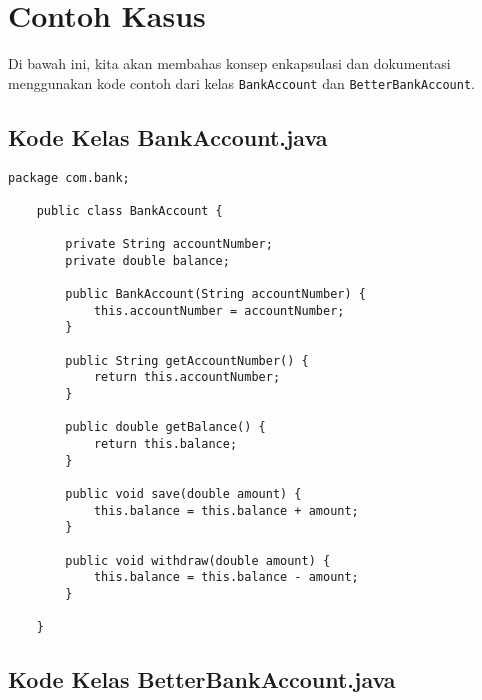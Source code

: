 \section{Contoh Kasus}

Di bawah ini, kita akan membahas konsep enkapsulasi dan dokumentasi menggunakan kode contoh dari kelas \texttt{BankAccount} dan \texttt{BetterBankAccount}.

\subsection{Kode Kelas BankAccount.java}

\begin{lstlisting}[style=JavaStyle, caption={Kode Java: BankAccount.java}]
	package com.bank;
	
	public class BankAccount {
		
		private String accountNumber;
		private double balance;
		
		public BankAccount(String accountNumber) {
			this.accountNumber = accountNumber;
		}
		
		public String getAccountNumber() {
			return this.accountNumber;
		}
		
		public double getBalance() {
			return this.balance;
		}
		
		public void save(double amount) {
			this.balance = this.balance + amount;
		}
		
		public void withdraw(double amount) {
			this.balance = this.balance - amount;
		}
		
	}
\end{lstlisting}

\subsection{Kode Kelas BetterBankAccount.java}

